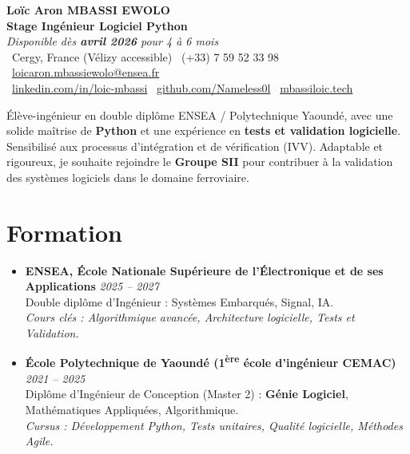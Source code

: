 \documentclass[a4paper,11pt]{article}
\begin{document}
\begin{center}
    {\Large \textbf{Loïc Aron MBASSI EWOLO}} \\ \vspace{4pt}
    \textbf{\large Stage Ingénieur Logiciel Python} \\
    \textit{\small Disponible dès \textbf{avril 2026} pour 4 à 6 mois} \\ \vspace{4pt}
    \small
    \faMapMarker\ Cergy, France (Vélizy accessible) \quad
    \faPhone\ (+33) 7 59 52 33 98 \quad
    \faEnvelope\ \href{mailto:loicaron.mbassiewolo@ensea.fr}{loicaron.mbassiewolo@ensea.fr} \\ \vspace{2pt}
    \faLinkedin\ \href{https://www.linkedin.com/in/loic-mbassi/}{linkedin.com/in/loic-mbassi} \quad
    \faGithub\ \href{https://github.com/Nameless0l}{github.com/Nameless0l} \quad
    \faGlobe\ \href{https://mbassiloic.tech}{mbassiloic.tech}
\end{center}

\vspace{-6pt}

\noindent\small{Élève-ingénieur en double diplôme ENSEA / Polytechnique Yaoundé, avec une solide maîtrise de \textbf{Python} et une expérience en \textbf{tests et validation logicielle}. Sensibilisé aux processus d'intégration et de vérification (IVV). Adaptable et rigoureux, je souhaite rejoindre le \textbf{Groupe SII} pour contribuer à la validation des systèmes logiciels dans le domaine ferroviaire.}

\section{Formation}
\begin{itemize}[leftmargin=*, label=\tiny$\bullet$, nosep]
    \item \textbf{ENSEA, École Nationale Supérieure de l'Électronique et de ses Applications} \hfill \textit{2025 -- 2027} \\
    \small{Double diplôme d'Ingénieur : Systèmes Embarqués, Signal, IA.} \\
    \textit{\small{Cours clés : Algorithmique avancée, Architecture logicielle, Tests et Validation.}}
    \item \textbf{École Polytechnique de Yaoundé (1\textsuperscript{ère} école d'ingénieur CEMAC)} \hfill \textit{2021 -- 2025} \\
    \small{Diplôme d'Ingénieur de Conception (Master 2) : \textbf{Génie Logiciel}, Mathématiques Appliquées, Algorithmique.} \\
    \textit{\small{Cursus : Développement Python, Tests unitaires, Qualité logicielle, Méthodes Agile.}}
\end{itemize}
\end{document}
